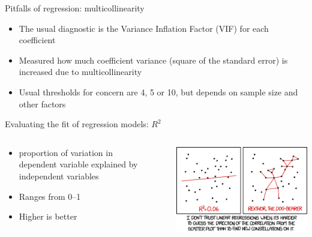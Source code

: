 \begin{frame}{Pitfalls of regression: multicollinearity}
  \begin{itemize}
    \item The usual diagnostic is the Variance Inflation Factor (VIF) for each coefficient
    \item Measured how much coefficient variance (square of the standard error) is increased due to multicollinearity
    \item Usual thresholds for concern are 4, 5 or 10, but depends on sample size and other factors \autocite[see][]{obrien_caution_2007}
  \end{itemize}
\end{frame}

\begin{frame}{Evaluating the fit of regression models: $R^2$}
  \begin{columns}
    \begin{column}{0.65\textwidth}
      \begin{itemize}
        \item proportion of variation in dependent variable explained by independent variables
        \item Ranges from 0--1
        \item Higher is better
      \end{itemize}
    \end{column}~%
    \begin{column}{0.34\textwidth}
      \includegraphics[width=\textwidth]{xkcd_linear_regression.png}
    \end{column}
  \end{columns}
\end{frame}

